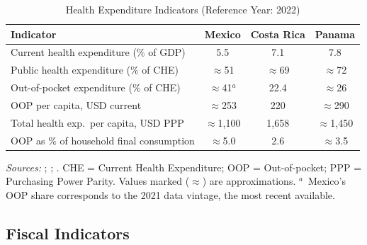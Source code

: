 \documentclass[12pt,a4paper]{article}
\begin{document}
\begin{appendices}
\begin{table}[H]
\centering
\caption{Health Expenditure Indicators (Reference Year: 2022)}
\label{tab:health_exp}
\begin{tabular}{lccc}
\hline\hline
\textbf{Indicator} & \textbf{Mexico} & \textbf{Costa Rica} & \textbf{Panama} \\
\hline
Current health expenditure (\% of GDP)       & 5.5          & 7.1   & 7.8   \\
Public health expenditure (\% of CHE)        & $\approx$51  & $\approx$69 & $\approx$72 \\
Out-of-pocket expenditure (\% of CHE)        & $\approx$41$^{a}$ & 22.4 & $\approx$26 \\
OOP per capita, USD current                  & $\approx$253 & 220   & $\approx$290 \\
Total health exp.\ per capita, USD PPP       & $\approx$1{,}100 & 1{,}658 & $\approx$1{,}450 \\
OOP as \% of household final consumption     & $\approx$5.0 & 2.6   & $\approx$3.5 \\
\hline\hline
\end{tabular}
\begin{minipage}{\linewidth}
\smallskip
\footnotesize
\textit{Sources:} \citet{WHOGHED2024}; \citet{OECDHaG2023};
\citet{WHOGHO2024}. CHE = Current Health Expenditure; OOP =
Out-of-pocket; PPP = Purchasing Power Parity. Values marked
($\approx$) are approximations. $^{a}$~Mexico's OOP share
corresponds to the 2021 data vintage, the most recent available.
\end{minipage}
\end{table}

\subsection{Fiscal Indicators}
\label{app:fiscal_table}


\end{appendices}
\end{document}
